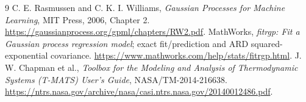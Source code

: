 \begin{thebibliography}{9}
 C. E. Rasmussen and C. K. I. Williams, \emph{Gaussian Processes for Machine Learning}, MIT Press, 2006, Chapter 2. \url{https://gaussianprocess.org/gpml/chapters/RW2.pdf}.
 MathWorks, \emph{fitrgp: Fit a Gaussian process regression model}; exact fit/prediction and ARD squared-exponential covariance. \url{https://www.mathworks.com/help/stats/fitrgp.html}.
 J. W. Chapman et al., \emph{Toolbox for the Modeling and Analysis of Thermodynamic Systems (T-MATS) User's Guide}, NASA/TM-2014-216638. \url{https://ntrs.nasa.gov/archive/nasa/casi.ntrs.nasa.gov/20140012486.pdf}.
\end{thebibliography}

